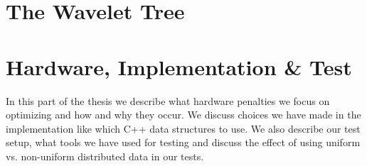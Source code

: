 \documentclass[11pt,twoside,openright]{article}
\begin{document}
\thispagestyle{empty}

\newpage
\tableofcontents
\newpage


\vspace*{\fill}

\vspace*{\fill}
\newpage

\part{The Wavelet Tree}









\newpage
\clearpage
\part{Hardware, Implementation \& Test}
In this part of the thesis we describe what hardware penalties we focus on optimizing and how and why they occur. 
We discuss choices we have made in the implementation like which C++ data structures to use. 
We also describe our test setup, what tools we have used for testing and discuss the effect of using uniform vs. non-uniform distributed data in our tests.
\end{document}
